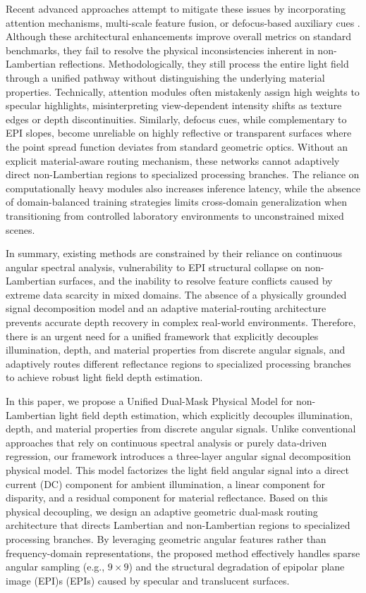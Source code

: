 Recent advanced approaches attempt to mitigate these issues by incorporating attention mechanisms, multi-scale feature fusion, or defocus-based auxiliary cues . Although these architectural enhancements improve overall metrics on standard benchmarks, they fail to resolve the physical inconsistencies inherent in non-Lambertian reflections. Methodologically, they still process the entire light field through a unified pathway without distinguishing the underlying material properties. Technically, attention modules often mistakenly assign high weights to specular highlights, misinterpreting view-dependent intensity shifts as texture edges or depth discontinuities. Similarly, defocus cues, while complementary to EPI slopes, become unreliable on highly reflective or transparent surfaces where the point spread function deviates from standard geometric optics. Without an explicit material-aware routing mechanism, these networks cannot adaptively direct non-Lambertian regions to specialized processing branches. The reliance on computationally heavy modules also increases inference latency, while the absence of domain-balanced training strategies limits cross-domain generalization when transitioning from controlled laboratory environments to unconstrained mixed scenes.

In summary, existing methods are constrained by their reliance on continuous angular spectral analysis, vulnerability to EPI structural collapse on non-Lambertian surfaces, and the inability to resolve feature conflicts caused by extreme data scarcity in mixed domains. The absence of a physically grounded signal decomposition model and an adaptive material-routing architecture prevents accurate depth recovery in complex real-world environments. Therefore, there is an urgent need for a unified framework that explicitly decouples illumination, depth, and material properties from discrete angular signals, and adaptively routes different reflectance regions to specialized processing branches to achieve robust light field depth estimation.

In this paper, we propose a Unified Dual-Mask Physical Model for non-Lambertian light field depth estimation, which explicitly decouples illumination, depth, and material properties from discrete angular signals. Unlike conventional approaches that rely on continuous spectral analysis or purely data-driven regression, our framework introduces a three-layer angular signal decomposition physical model. This model factorizes the light field angular signal into a direct current (DC) component for ambient illumination, a linear component for disparity, and a residual component for material reflectance. Based on this physical decoupling, we design an adaptive geometric dual-mask routing architecture that directs Lambertian and non-Lambertian regions to specialized processing branches. By leveraging geometric angular features rather than frequency-domain representations, the proposed method effectively handles sparse angular sampling (e.g., $9 \times 9$) and the structural degradation of epipolar plane image (EPI)s (EPIs) caused by specular and translucent surfaces.

